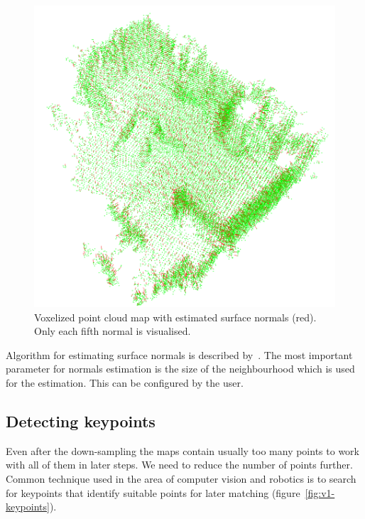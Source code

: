 \begin{figure}
    \centering
    \includegraphics[width=\textwidth]{../img/v1-normals.png}
    \caption[Point cloud map with estimated surface normals]{Voxelized point cloud map with estimated surface normals (red). Only each fifth normal is visualised.}
    \label{fig:v1-normals}
\end{figure}

Algorithm for estimating surface normals is described by~\citet{RusuDoctoralDissertation}. The most important parameter for normals estimation is the size of the neighbourhood which is used for the estimation. This can be configured by the user.

\subsection{Detecting keypoints}
\label{sec:detect-keypoints}

Even after the down-sampling the maps contain usually too many points to work with all of them in later steps. We need to reduce the number of points further. Common technique used in the area of computer vision and robotics is to search for keypoints that identify suitable points for later matching (figure~\ref{fig:v1-keypoints}).

